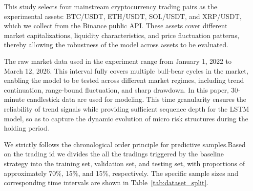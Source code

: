 \documentclass[12pt]{article}
\begin{document}
This study selects four mainstream cryptocurrency trading pairs as the experimental assets: BTC/USDT, ETH/USDT, SOL/USDT, and XRP/USDT, which we collect from the Binance public API. These assets cover different market capitalizations, liquidity characteristics, and price fluctuation patterns, thereby allowing the robustness of the model across assets to be evaluated.

The raw market data used in the experiment range from January 1, 2022 to March 12, 2026. This interval fully covers multiple bull-bear cycles in the market, enabling the model to be tested across different market regimes, including trend continuation, range-bound fluctuation, and sharp drawdown. In this paper, 30-minute candlestick data are used for modeling. This time granularity ensures the reliability of trend signals while providing sufficient sequence depth for the LSTM model, so as to capture the dynamic evolution of micro risk structures during the holding period.

We strictly follows the chronological order principle for predictive samples.Based on the trading id we  divides the all the tradings triggered by the baseline strategy into the training set, validation set, and testing set, with proportions of approximately 70\%, 15\%, and 15\%, respectively. The specific sample sizes and corresponding time intervals are shown in Table~\ref{tab:dataset_split}.
\end{document}
